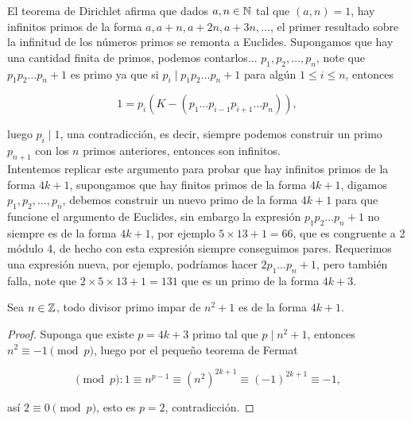 
\thispagestyle{empty}
\vspace{-0.7cm}


El teorema de Dirichlet afirma que dados $a,n\in  \mathbb{N}$ tal que $(a,n)=1$, hay infinitos primos de la forma $a, a+n, a+2n, a+3n,\ldots$, el primer resultado sobre la infinitud de los números primos se remonta a Euclides. Supongamos que hay una cantidad  finita de primos, podemos contarlos... $p_1,p_2,\ldots,p_n$, note que $p_1p_2\ldots p_n+1$ es primo ya que si $p_i\mid p_1p_2\ldots p_n+ 1$ para algún $1\leq i\leq n$, entonces

$$1=p_i(K-(p_1\ldots p_{i-1}p_{i+1}\ldots p_n)),$$

luego $p_i\mid 1$, una contradicción, es decir, siempre podemos construir un primo $p_{n+1}$ con los $n$ primos anteriores, entonces son infinitos.\\

Intentemos replicar este argumento para probar que hay infinitos primos de la forma $4k+1$, supongamos que hay finitos primos de la forma $4k+1$, digamos $p_1,p_2,\ldots,p_n$, debemos construir un nuevo primo de  la forma $4k+1$ para que funcione el argumento de Euclides, sin embargo la expresión  $p_1p_2\ldots p_n+1$ no siempre es de la forma $4k+1$, por ejemplo $5\times13+1=66$, que es congruente a 2 módulo 4, de hecho con esta expresión siempre conseguimos pares. Requerimos una expresión nueva, por ejemplo, podríamos hacer $2p_1\ldots p_n+1$, pero también falla, note que $2\times5\times13+1=131$ que es un primo de la forma $4k+3$.\\

\begin{prop}

Sea $n\in \mathbb{Z}$, todo divisor primo impar de $n^2+1$ es de la forma $4k+1$. 
\end{prop}

\begin{proof}
Suponga que existe $p=4k+3$ primo tal que $p\mid n^2+1$, entonces $n^2\equiv -1 \pmod{p}$, luego por el pequeño teorema de Fermat

$$\pmod{p}: 1\equiv n^{ p-1}\equiv (n^{2})^{2k+1}\equiv (-1)^{2k+1}\equiv -1,$$

así $2\equiv 0 \pmod{p}$, esto es $p=2$, contradicción.

\end{proof}

